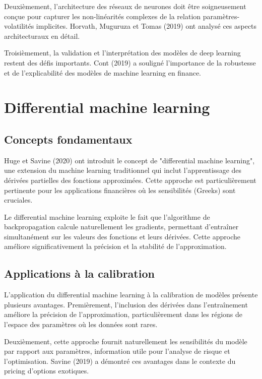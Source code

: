 Deuxièmement, l'architecture des réseaux de neurones doit être soigneusement conçue pour capturer les non-linéarités complexes de la relation paramètres-volatilités implicites. Horvath, Muguruza et Tomas (2019) ont analysé ces aspects architecturaux en détail.

Troisièmement, la validation et l'interprétation des modèles de deep learning restent des défis importants. Cont (2019) a souligné l'importance de la robustesse et de l'explicabilité des modèles de machine learning en finance.

\section{Differential machine learning}

\subsection{Concepts fondamentaux}

Huge et Savine (2020) ont introduit le concept de "differential machine learning", une extension du machine learning traditionnel qui inclut l'apprentissage des dérivées partielles des fonctions approximées. Cette approche est particulièrement pertinente pour les applications financières où les sensibilités (Greeks) sont cruciales.

Le differential machine learning exploite le fait que l'algorithme de backpropagation calcule naturellement les gradients, permettant d'entraîner simultanément sur les valeurs des fonctions et leurs dérivées. Cette approche améliore significativement la précision et la stabilité de l'approximation.

\subsection{Applications à la calibration}

L'application du differential machine learning à la calibration de modèles présente plusieurs avantages. Premièrement, l'inclusion des dérivées dans l'entraînement améliore la précision de l'approximation, particulièrement dans les régions de l'espace des paramètres où les données sont rares.

Deuxièmement, cette approche fournit naturellement les sensibilités du modèle par rapport aux paramètres, information utile pour l'analyse de risque et l'optimisation. Savine (2019) a démontré ces avantages dans le contexte du pricing d'options exotiques.

